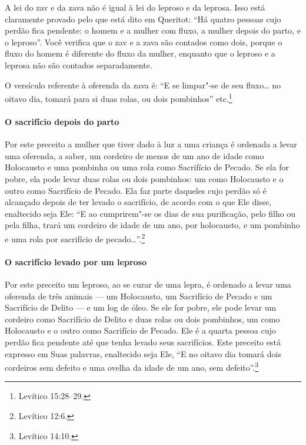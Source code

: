 \begin{multicols}{2}
A lei do zav\starr{} e da zava\starr{} não é igual à lei do leproso e da
leprosa. Isso está claramente provado pelo que está dito em Queritot\starr:
``Há quatro pessoas cujo perdão fica pendente: o homem e a mulher com
fluxo, a mulher depois do parto, e o leproso''. Você verifica que o
zav\starr{} e a zava\starr{} são contados como dois, porque o fluxo do homem é
diferente do fluxo da mulher, enquanto que o leproso e a leprosa não
são contados separadamente.

O versículo referente à oferenda da zava\starr{} é: ``E se limpar"-se de seu
fluxo\ldots{} no oitavo dia, tomará para si duas rolas, ou dois pombinhos''
etc.\footnote{Levítico 15:28--29.}

\paragraph{O sacrifício depois do parto}

Por este preceito a mulher que tiver dado à luz a uma criança é
ordenada a levar uma oferenda, a saber, um cordeiro de menos de um ano
de idade como Holocausto e uma pombinha ou uma rola como Sacrifício de
Pecado. Se ela for pobre, ela pode levar duas rolas ou dois pombinhos:
um como Holocausto e o outro como Sacrifício de Pecado. Ela faz parte
daqueles cujo perdão só é alcançado depois de ter levado o sacrifício,
de acordo com o que Ele disse, enaltecido seja Ele: ``E ao cumprirem"-se
os dias de sua purificação, pelo filho ou pela filha, trará um cordeiro
de idade de um ano, por holocausto, e um pombinho e uma rola por
sacrifício de pecado\ldots{}''.\footnote{Levítico 12:6.}

\paragraph{O sacrifício levado por um leproso}

Por este preceito um leproso, ao se curar de uma lepra, é ordenado a
levar uma oferenda de três animais --- um Holocausto, um Sacrifício de
Pecado e um Sacrifício de Delito --- e um log\starr{}
de óleo. Se ele for pobre, ele pode levar um cordeiro como Sacrifício de
Delito e duas rolas ou dois pombinhos, um como Holocausto e o outro como
Sacrifício de Pecado. Ele é a quarta pessoa cujo perdão fica pendente
até que tenha levado seus sacrifícios. Este preceito está expresso em
Suas palavras, enaltecido seja Ele, ``E no oitavo dia tomará dois
cordeiros sem defeito e uma ovelha da idade de um ano, sem defeito''.\footnote{Levítico 14:10.}


\end{multicols}
